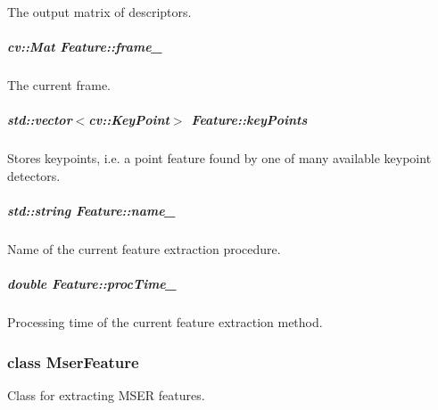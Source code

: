 The output matrix of descriptors. 

\hypertarget{group___feature_extractor_aa805e6fee8eeec2061feabe29430f0df}{
\subparagraph[{frame\-\_\-}]{\setlength{\rightskip}{0pt plus 5cm}cv\-::\-Mat Feature\-::frame\-\_\-\hspace{0.3cm}{\ttfamily [protected]}}}\label{group___feature_extractor_aa805e6fee8eeec2061feabe29430f0df}


The current frame. 

\hypertarget{group___feature_extractor_ac666ae973c3840be1b3b9183dd12b8c1}{
\subparagraph[{key\-Points}]{\setlength{\rightskip}{0pt plus 5cm}std\-::vector$<$cv\-::\-Key\-Point$>$ Feature\-::key\-Points}}\label{group___feature_extractor_ac666ae973c3840be1b3b9183dd12b8c1}


Stores keypoints, i.\-e. a point feature found by one of many available keypoint detectors. 

\hypertarget{group___feature_extractor_a46e9fc1f327aaafb10de2c0425d311aa}{
\subparagraph[{name\-\_\-}]{\setlength{\rightskip}{0pt plus 5cm}std\-::string Feature\-::name\-\_\-\hspace{0.3cm}{\ttfamily [protected]}}}\label{group___feature_extractor_a46e9fc1f327aaafb10de2c0425d311aa}


Name of the current feature extraction procedure. 

\hypertarget{group___feature_extractor_a1b176bd48aad30b553e0f87f0264c3d0}{
\subparagraph[{proc\-Time\-\_\-}]{\setlength{\rightskip}{0pt plus 5cm}double Feature\-::proc\-Time\-\_\-\hspace{0.3cm}{\ttfamily [protected]}}}\label{group___feature_extractor_a1b176bd48aad30b553e0f87f0264c3d0}


Processing time of the current feature extraction method. 

\label{class_mser_feature}
\hypertarget{group___feature_extractor_class_mser_feature}{}
\subsubsection{class Mser\-Feature}
Class for extracting M\-S\-E\-R features. 


